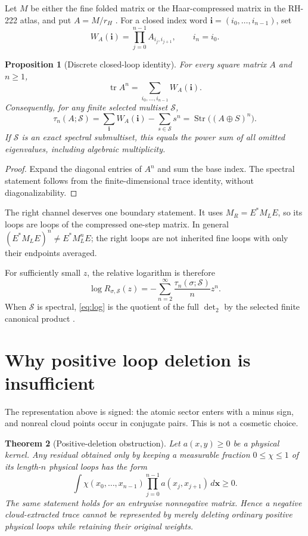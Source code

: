 \documentclass[11pt]{article}
\newtheorem{theorem}{Theorem}[section]
\newtheorem{proposition}[theorem]{Proposition}
\theoremstyle{remark}
\newcommand{\Tr}{\operatorname{tr}}
\newcommand{\Str}{\operatorname{Str}}
\begin{document}
Let $M$ be either the fine folded matrix or the Haar-compressed matrix in the
RH-222 atlas, and put $A=M/r_H$ \citep{WangRH222}.  For a closed index word
$\boldsymbol i=(i_0,\ldots,i_{n-1})$, set
\[
 W_A(\boldsymbol i)=\prod_{j=0}^{n-1}A_{i_j,i_{j+1}},
 \qquad i_n=i_0.
\]

\begin{proposition}[Discrete closed-loop identity]\label{prop:discrete}
For every square matrix $A$ and $n\ge1$,
\[
 \Tr A^n=\sum_{i_0,\ldots,i_{n-1}}W_A(\boldsymbol i).
\]
Consequently, for any finite selected multiset $\mathcal S$,
\[
 \tau_n(A;\mathcal S)
 =\sum_{\boldsymbol i}W_A(\boldsymbol i)-\sum_{s\in\mathcal S}s^n
 =\Str\bigl((A\oplus S)^n\bigr).
\]
If $\mathcal S$ is an exact spectral submultiset, this equals the power sum
of all omitted eigenvalues, including algebraic multiplicity.
\end{proposition}

\begin{proof}
Expand the diagonal entries of $A^n$ and sum the base index.  The spectral
statement follows from the finite-dimensional trace identity, without
diagonalizability.
\end{proof}

The right channel deserves one boundary statement.  It uses
$M_R=E^*M_LE$, so its loops are loops of the compressed one-step matrix.  In
general $(E^*M_LE)^n\ne E^*M_L^nE$; the right loops are not inherited fine
loops with only their endpoints averaged.

For sufficiently small $z$, the relative logarithm is therefore
\begin{equation}\label{eq:log}
 \log R_{\sigma,\mathcal S}(z)
 =-\sum_{n=2}^{\infty}\frac{\tau_n(\sigma;\mathcal S)}{n}z^n.
\end{equation}
When $\mathcal S$ is spectral, \eqref{eq:log} is the quotient of the full
$\det_2$ by the selected finite canonical product \citep{WangRH234}.

\section{Why positive loop deletion is insufficient}

The representation above is signed: the atomic sector enters with a minus
sign, and nonreal cloud points occur in conjugate pairs.  This is not a
cosmetic choice.

\begin{theorem}[Positive-deletion obstruction]\label{thm:deletion}
Let $a(x,y)\ge0$ be a physical kernel.  Any residual obtained only by keeping
a measurable fraction $0\le\chi\le1$ of its length-$n$ physical loops has
the form
\[
 \int\chi(x_0,\ldots,x_{n-1})
 \prod_{j=0}^{n-1}a(x_j,x_{j+1})\,d\boldsymbol x\ge0.
\]
The same statement holds for an entrywise nonnegative matrix.  Hence a
negative cloud-extracted trace cannot be represented by merely deleting
ordinary positive physical loops while retaining their original weights.
\end{theorem}
\end{document}
